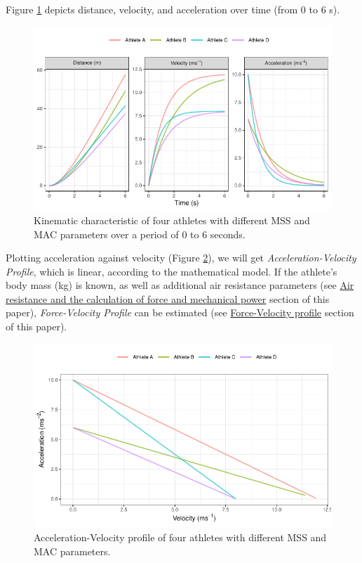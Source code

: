 \documentclass[fleqn,10pt,lineno]{wlpeerj} %
\begin{document}
Figure \ref{fig:four-athletes-kinematics} depicts distance, velocity, and acceleration over time (from 0 to 6 s).

\begin{figure}

{\centering \includegraphics[width=0.9\linewidth]{paper_files/figure-latex/four-athletes-kinematics-1} 

}

\caption{Kinematic characteristic of four athletes with different MSS and MAC parameters over a period of 0 to 6 seconds.}\label{fig:four-athletes-kinematics}
\end{figure}

Plotting acceleration against velocity (Figure \ref{fig:four-athletes-profile}), we will get \emph{Acceleration-Velocity Profile}, which is linear, according to the mathematical model. If the athlete's body mass (kg) is known, as well as additional air resistance parameters (see \protect\hyperlink{air-resistance-and-the-calculation-of-force-and-mechanical-power}{Air resistance and the calculation of force and mechanical power} section of this paper), \emph{Force-Velocity Profile} can be estimated (see \protect\hyperlink{force-velocity-profile}{Force-Velocity profile} section of this paper).

\begin{figure}

{\centering \includegraphics[width=0.9\linewidth]{paper_files/figure-latex/four-athletes-profile-1} 

}

\caption{Acceleration-Velocity profile of four athletes with different MSS and MAC parameters.}\label{fig:four-athletes-profile}
\end{figure}
\end{document}

